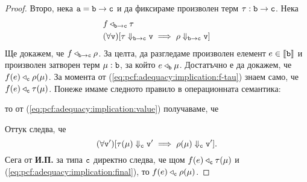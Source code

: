 \begin{proof}
  Второ, нека $\vv{a} = \vv{b} \to \vv{c}$ и да фиксираме произволен терм $\tau : \vv{b} \to \vv{c}$.
  Нека
  \begin{align}
    & f \triangleleft_{\vv{b}\to\vv{c}} \tau \label{eq:pcf:adequacy:implication:f-tau}\\
    & (\forall \vv{v})[\tau \Downarrow_{\vv{b}\to\vv{c}} \vv{v} \implies \rho \Downarrow_{\vv{b}\to\vv{c}} \vv{v}] \label{eq:pcf:adequacy:implication:value}
  \end{align}
  Ще докажем, че $f \triangleleft_{\vv{b} \to \vv{c}} \rho$.
  За целта, да разгледаме произволен елемент $e \in \val{\vv{b}}$ и произволен затворен терм $\mu : \vv{b}$, за който $e \triangleleft_{\vv{b}} \mu$.
  Достатъчно е да докажем, че $f(e) \triangleleft_{\vv{c}} \rho(\mu)$.
  За момента от (\ref{eq:pcf:adequacy:implication:f-tau}) знаем само, че $f(e) \triangleleft_{\vv{c}} \tau(\mu)$.
  Понеже имаме следното правило в операционната семантика:
  \begin{prooftree}
  \end{prooftree}
  то от (\ref{eq:pcf:adequacy:implication:value}) получаваме, че
  \begin{prooftree}
  \end{prooftree}
  Оттук следва, че
  \begin{equation}
    \label{eq:pcf:adequacy:implication:final}
    (\forall \vv{v}')[\tau(\mu) \Downarrow_{\vv{c}} \vv{v}' \implies \rho(\mu) \Downarrow_{\vv{c}} \vv{v}'].
  \end{equation}
  Сега от {\bf И.П.} за типа $\vv{c}$ директно следва, че щом $f(e) \triangleleft_{\vv{c}}\tau(\mu)$ и (\ref{eq:pcf:adequacy:implication:final}), то $f(e) \triangleleft_{\vv{c}} \rho(\mu)$.
\end{proof}




